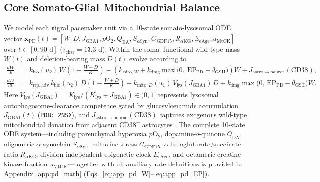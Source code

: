 \documentclass[11pt]{article}
\theoremstyle{plain}
\begin{document}
\subsection{Core Somato-Glial Mitochondrial Balance}
We model each nigral pacemaker unit via a 10-state somato-lysosomal ODE vector $\mathbf{x}_{\mathrm{PD}}(t) = [W,\allowbreak D,\allowbreak J_{\mathrm{GBA1}},\allowbreak p\mathrm{O}_2,\allowbreak Q_{\mathrm{DA}},\allowbreak S_{\alpha\mathrm{Syn}},\allowbreak G_{\mathrm{GDF15}},\allowbreak R_{\alpha\mathrm{KG}},\allowbreak E_{\mathrm{eAge}},\allowbreak u_{\mathrm{MtCK}}]^\top$ over $t \in [0, 90\text{ d}]$ ($\tau_{\mathrm{char}} = 13.3\text{ d}$). Within the soma, functional wild-type mass $W(t)$ and deletion-bearing mass $D(t)$ evolve according to
\begin{align}
  \frac{dW}{dt} &= k_{\mathrm{bio}}(u_2)\,W\left(1 - \frac{W+D}{K}\right) - \left(k_{\mathrm{mito},W} + k_{\mathrm{dmg}}\max\!\big(0,\ \mathrm{EP}_{\mathrm{PD}} - \theta_{\mathrm{GSH}}\big)\right)W + J_{\mathrm{astro}\to\mathrm{neuron}}(\mathrm{CD38}), \nonumber\\
  \frac{dD}{dt} &= k_{\mathrm{rep,adv}}\,k_{\mathrm{bio}}(u_2)\,D\left(1 - \frac{W+D}{K}\right) - k_{\mathrm{mito},D}(u_1)\,V_{\mathrm{lys}}(J_{\mathrm{GBA1}})\,D + k_{\mathrm{dmg}}\max\!\big(0,\ \mathrm{EP}_{\mathrm{PD}} - \theta_{\mathrm{GSH}}\big)W.
  \label{eq:pd_core}
\end{align}
Here $V_{\mathrm{lys}}(J_{\mathrm{GBA1}}) = K_{\mathrm{lys}} / (K_{\mathrm{lys}} + J_{\mathrm{GBA1}}) \in (0, 1]$ represents lysosomal autophagosome-clearance competence gated by glucosylceramide accumulation $J_{\mathrm{GBA1}}(t)$ (\texttt{PDB: 2NSX}), and $J_{\mathrm{astro}\to\mathrm{neuron}}(\mathrm{CD38})$ captures exogenous wild-type mitochondrial donation from adjacent $\mathrm{CD38}^+$ astrocytes \cite{hayakawa2016transfer}. The complete 10-state ODE system---including parenchymal hyperoxia $p\mathrm{O}_2$, dopamine-$o$-quinone $Q_{\mathrm{DA}}$, oligomeric $\alpha$-synuclein $S_{\alpha\mathrm{Syn}}$, mitokine stress $G_{\mathrm{GDF15}}$, $\alpha$-ketoglutarate/succinate ratio $R_{\alpha\mathrm{KG}}$, division-independent epigenetic clock $E_{\mathrm{eAge}}$, and octameric creatine kinase fraction $u_{\mathrm{MtCK}}$---together with all auxiliary rate definitions is provided in Appendix~\ref{app:pd_math} (Eqs.~\eqref{eq:app_pd_W}--\eqref{eq:app_pd_EP}).
\end{document}

